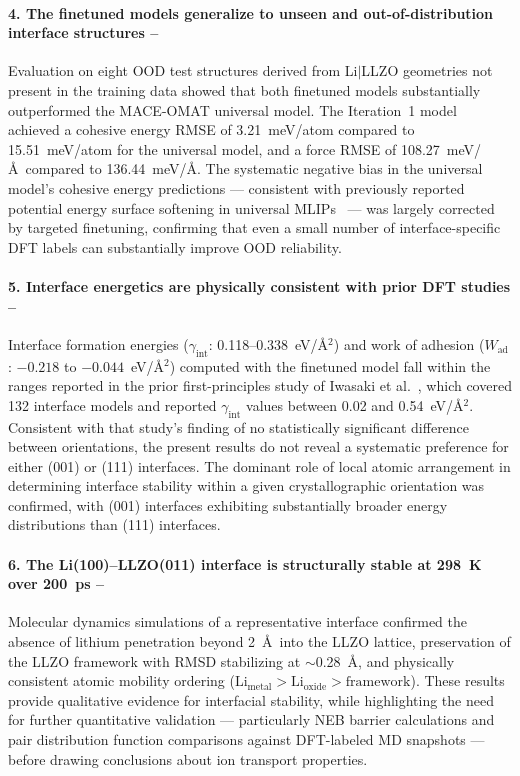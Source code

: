 \documentclass[12pt,a4paper,oneside]{book}
\begin{document}
\paragraph{4. The finetuned models generalize to unseen and out-of-distribution interface structures --}
Evaluation on eight OOD test structures derived from Li$|$LLZO geometries
not present in the training data showed that both finetuned models substantially
outperformed the MACE-OMAT universal model. The Iteration~1 model achieved a
cohesive energy RMSE of 3.21~meV/atom compared to 15.51~meV/atom for the universal
model, and a force RMSE of 108.27~meV/\AA\ compared to 136.44~meV/\AA. The systematic
negative bias in the universal model's cohesive energy predictions --- consistent with
previously reported potential energy surface softening in universal MLIPs~\cite{Deng2025Softening} --- was
largely corrected by targeted finetuning, confirming that even a small number of
interface-specific DFT labels can substantially improve OOD reliability.

\paragraph{5. Interface energetics are physically consistent with prior DFT studies --}
Interface formation energies ($\gamma_{\mathrm{int}}$: 0.118--0.338~eV/\AA$^2$) and
work of adhesion ($W_{\mathrm{ad}}$: $-0.218$ to $-0.044$~eV/\AA$^2$) computed
with the finetuned model fall within the ranges reported in the prior first-principles
study of Iwasaki et al.~\cite{Iwasaki2022DFT_Li_LLZO_PSSB}, which covered 132 interface
models and reported $\gamma_{\mathrm{int}}$ values between 0.02 and 0.54~eV/\AA$^2$.
Consistent with that study's finding of no statistically significant difference between
orientations, the present results do not reveal a systematic preference for either
(001) or (111) interfaces. The dominant role of local atomic arrangement in
determining interface stability within a given crystallographic orientation was
confirmed, with (001) interfaces exhibiting substantially broader energy distributions
than (111) interfaces.

\paragraph{6. The Li(100)--LLZO(011) interface is structurally stable at 298~K over 200~ps --}
Molecular dynamics simulations of a representative interface confirmed the absence of
lithium penetration beyond 2~\AA\ into the LLZO lattice, preservation of the LLZO
framework with RMSD stabilizing at $\sim$0.28~\AA, and physically consistent atomic
mobility ordering ($\mathrm{Li}_{\mathrm{metal}} > \mathrm{Li}_{\mathrm{oxide}} >
\mathrm{framework}$). These results provide qualitative evidence for interfacial
stability, while highlighting the need for further quantitative validation ---
particularly NEB barrier calculations and pair distribution function comparisons
against DFT-labeled MD snapshots --- before drawing conclusions about ion
transport properties.
\end{document}
